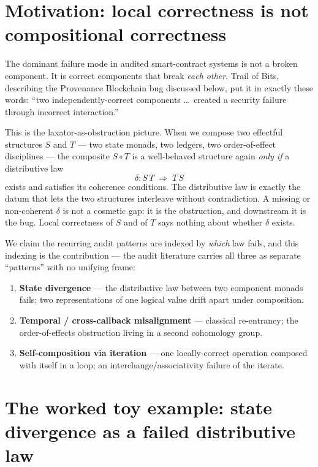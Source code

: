 \documentclass[11pt]{amsart}
\theoremstyle{definition}
\theoremstyle{remark}
\begin{document}
\section{Motivation: local correctness is not compositional correctness}

The dominant failure mode in audited smart-contract systems is not a broken component. It is
correct components that break \emph{each other}. Trail of Bits, describing the Provenance
Blockchain bug discussed below, put it in exactly these words: ``two independently-correct
components \ldots\ created a security failure through incorrect interaction.''

This is the laxator-as-obstruction picture. When we compose two effectful structures $S$ and
$T$ --- two state monads, two ledgers, two order-of-effect disciplines --- the composite $S\circ
T$ is a well-behaved structure again \emph{only if} a distributive law
\[
  \delta : S\,T \;\Longrightarrow\; T\,S
\]
exists and satisfies its coherence conditions. The distributive law is exactly the datum that
lets the two structures interleave without contradiction. A missing or non-coherent $\delta$ is
not a cosmetic gap: it is the obstruction, and downstream it is the bug. Local correctness of
$S$ and of $T$ says nothing about whether $\delta$ exists.

We claim the recurring audit patterns are indexed by \emph{which} law fails, and this indexing
is the contribution --- the audit literature carries all three as separate ``patterns'' with no
unifying frame:
\begin{enumerate}[label=(\arabic*),leftmargin=2.2em]
  \item \textbf{State divergence} --- the distributive law between two component monads fails;
        two representations of one logical value drift apart under composition.
  \item \textbf{Temporal / cross-callback misalignment} --- classical re-entrancy; the
        order-of-effects obstruction living in a second cohomology group.
  \item \textbf{Self-composition via iteration} --- one locally-correct operation composed with
        itself in a loop; an interchange/associativity failure of the iterate.
\end{enumerate}

\section{The worked toy example: state divergence as a failed distributive law}
\end{document}
